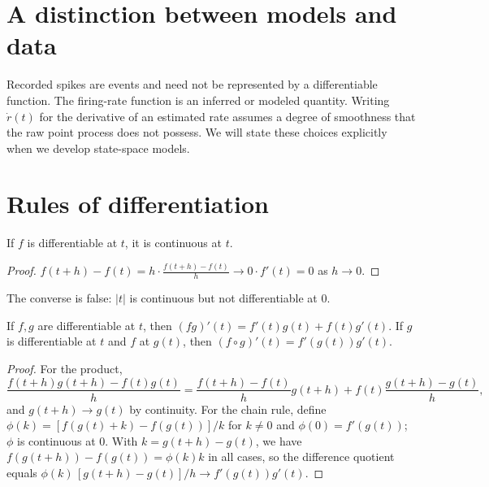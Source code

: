 \section{A distinction between models and data}
Recorded spikes are events and need not be represented by a differentiable function. The firing-rate function is an inferred or modeled quantity. Writing $\dot r(t)$ for the derivative of an estimated rate assumes a degree of smoothness that the raw point process does not possess. We will state these choices explicitly when we develop state-space models.

\section{Rules of differentiation}
\begin{proposition}
If $f$ is differentiable at $t$, it is continuous at $t$.
\end{proposition}
\begin{proof}
$f(t+h)-f(t)=h\cdot\frac{f(t+h)-f(t)}h\to0\cdot f'(t)=0$ as $h\to0$.
\end{proof}
The converse is false: $|t|$ is continuous but not differentiable at $0$.

\begin{theorem}
If $f,g$ are differentiable at $t$, then $(fg)'(t)=f'(t)g(t)+f(t)g'(t)$. If $g$ is differentiable at $t$ and $f$ at $g(t)$, then $(f\circ g)'(t)=f'(g(t))g'(t)$.
\end{theorem}
\begin{proof}
For the product,
\[
\frac{f(t+h)g(t+h)-f(t)g(t)}h=\frac{f(t+h)-f(t)}hg(t+h)+f(t)\frac{g(t+h)-g(t)}h,
\]
and $g(t+h)\to g(t)$ by continuity. For the chain rule, define $\phi(k)=[f(g(t)+k)-f(g(t))]/k$ for $k\ne0$ and $\phi(0)=f'(g(t))$; $\phi$ is continuous at $0$. With $k=g(t+h)-g(t)$, we have $f(g(t+h))-f(g(t))=\phi(k)k$ in all cases, so the difference quotient equals $\phi(k)\,[g(t+h)-g(t)]/h\to f'(g(t))g'(t)$.
\end{proof}

